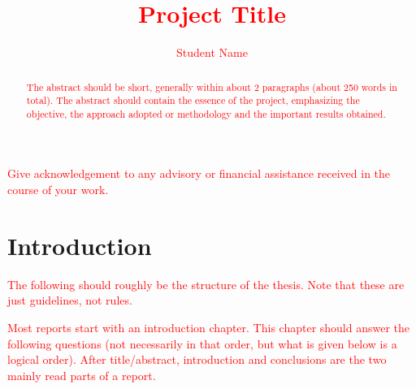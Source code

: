\documentclass[fyp]{socreport}
\begin{document}
\title{\textcolor{red}{Project Title}}
\author{\textcolor{red}{Student Name}}
\projyear{\textcolor{red}{2017/2018}}
\advisor{\textcolor{red}{Prof/Assoc Prof/Dr + Supervisor Name}}
\maketitle

\begin{abstract}
\textcolor{red}{The abstract should be short, generally within about 2 paragraphs (about 250 words in total). The abstract should contain the essence of the project, emphasizing the objective, the approach adopted or methodology and the important results obtained.}
\end{abstract}

\begin{acknowledgement}
\textcolor{red}{Give acknowledgement to any advisory or financial assistance received in the course of your work.}
\end{acknowledgement}

\tableofcontents
\newpage
\listoffigures
\newpage
\listoftables
\mbox{}
\printnomenclature[0.9in]

\chapter{Introduction}
\textcolor{red}{The following should roughly be the structure of the thesis. Note that these are just guidelines, not rules.}

\textcolor{red}{Most reports start with an introduction chapter. This chapter should answer the following questions (not necessarily in that order, but what is given below is a logical order). After title/abstract, introduction and conclusions are the two mainly read parts of a report.}
\end{document}
